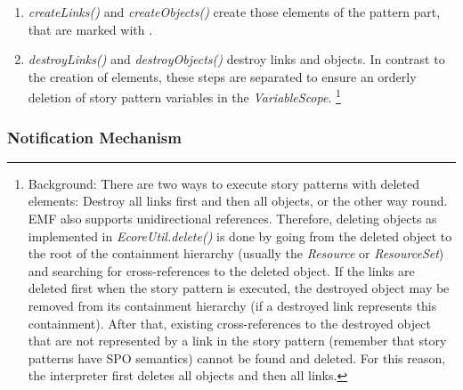 \begin{enumerate}
	\item \emph{createLinks()} and \emph{createObjects()} create those elements of the pattern part, that are marked with \create.
	
	\item \emph{destroyLinks()} and \emph{destroyObjects()} destroy links and objects. 
	In contrast to the creation of elements, these steps are separated to ensure an orderly deletion of story pattern variables in the \emph{VariableScope}.
	\footnote{Background: There are two ways to execute story patterns with deleted elements: Destroy all links first and then all objects, or the other way round. 
	EMF also supports unidirectional references. 
	Therefore, deleting objects as implemented in \emph{EcoreUtil.delete()} is done by going from the deleted object to the root of the containment hierarchy (usually the \emph{Resource} or \emph{ResourceSet}) and searching for cross-references to the deleted object. 
	If the links are deleted first when the story pattern is executed, the destroyed object may be removed from its containment hierarchy (if a destroyed link represents this containment). 
	After that, existing cross-references to the destroyed object that are not represented by a link in the story pattern (remember that story patterns have SPO semantics) cannot be found and deleted. 
	For this reason, the interpreter first deletes all objects and then all links.}
	

\end{enumerate}



\subsubsection{Notification Mechanism}
\label{sec:notification_mechanism}

